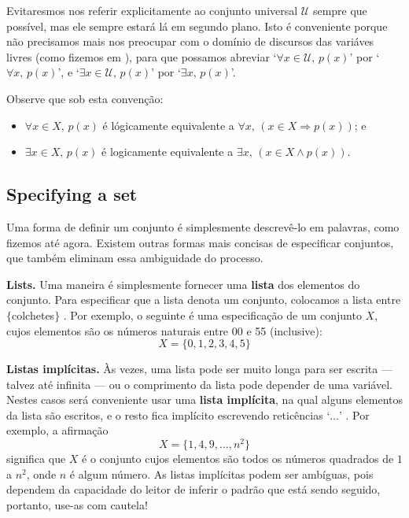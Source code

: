 Evitaresmos nos referir explicitamente ao conjunto universal $\mathcal{U}$ sempre que possível, mas ele sempre estará lá em segundo plano. Isto é conveniente porque não precisamos mais nos preocupar com o domínio de discursos das variáves livres (como fizemos em ), para que possamos abreviar `$\forall x \in \mathcal{U},\, p(x)$' por `$\forall x,\, p(x)$', e `$\exists x \in \mathcal{U},\, p(x)$' por `$\exists x,\, p(x)$'.

Observe que sob esta convenção:
\begin{itemize}
\item $\forall x \in X,\, p(x)$ é lógicamente equivalente a $\forall x,\, (x \in X \Rightarrow p(x))$; e
\item $\exists x \in X,\, p(x)$ é logicamente equivalente a  $\exists x,\, (x \in X \wedge p(x))$.
\end{itemize}

\subsection*{Specifying a set}
Uma forma de definir um conjunto é simplesmente descrevê-lo em palavras, como fizemos até agora. Existem outras formas mais concisas de especificar conjuntos, que também eliminam essa ambiguidade do processo.

\textbf{Lists.}
Uma maneira é simplesmente fornecer uma \textbf{lista} dos elementos do conjunto. Para especificar que a lista denota um conjunto, colocamos a lista entre $\{$colchetes$\}$ \inlatex{\{,\textbackslash{}\}}\lindexmmc{\{\dots\textbackslash{}\}}{$\{\dots\}$}. Por exemplo, o seguinte é uma especificação de um conjunto $X$, cujos elementos são os números naturais entre 00 e 55 (inclusive):
\[ X = \{ 0, 1, 2, 3, 4, 5 \} \]

\textbf{Listas implícitas.}
Às vezes, uma lista pode ser muito longa para ser escrita — talvez até infinita — ou o comprimento da lista pode depender de uma variável. Nestes casos será conveniente usar uma \textbf{lista implícita}, na qual alguns elementos da lista são escritos, e o resto fica implícito escrevendo reticências `$\dots$'  . Por exemplo, a afirmação
\[ X = \{ 1, 4, 9, \dots, n^2 \} \]
significa que $X$ é o conjunto cujos elementos são todos os números quadrados de $1$ a $n^2$, onde $n$ é algum número. As listas implícitas podem ser ambíguas, pois dependem da capacidade do leitor de inferir o padrão que está sendo seguido, portanto, use-as com cautela!

